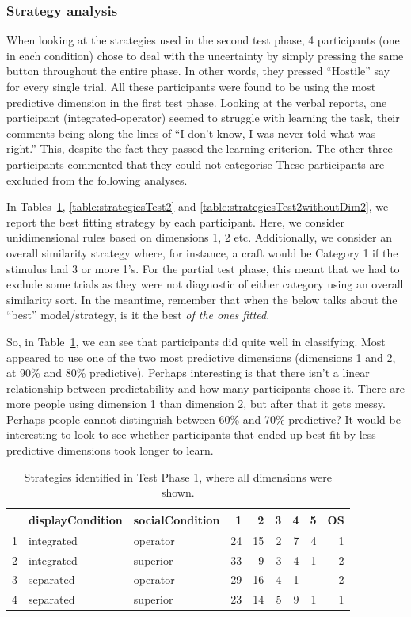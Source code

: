 \documentclass[doc, a4paper, apacite]{apa6}
\begin{document}
\subsubsection{Strategy analysis}

When looking at the strategies used in the second test phase, 4 participants (one in each condition) chose to deal with the uncertainty by simply pressing the same button throughout the entire phase.
In other words, they pressed ``Hostile'' say for every single trial.
All these participants were found to be using the most predictive dimension in the first test phase. 
Looking at the verbal reports, one participant (integrated-operator) seemed to struggle with learning the task, their comments being along the lines of ``I don't know, I was never told what was right.''
This, despite the fact they passed the learning criterion. 
The other three participants commented that they could not categorise 
These participants are excluded from the following analyses. 

In Tables~\ref{table:strategiesTest1}, \ref{table:strategiesTest2} and \ref{table:strategiesTest2withoutDim2}, we report the best fitting strategy by each participant. 
Here, we consider unidimensional rules based on dimensions 1, 2 etc. 
Additionally, we consider an overall similarity strategy where, for instance, a craft would be Category 1 if the stimulus had 3 or more 1's. 
For the partial test phase, this meant that we had to exclude some trials as they were not diagnostic of either category using an overall similarity sort. 
In the meantime, remember that when the below talks about the ``best'' model/strategy, is it the best \emph{of the ones fitted}.

So, in Table~\ref{table:strategiesTest1}, we can see that participants did quite well in classifying. 
Most appeared to use one of the two most predictive dimensions (dimensions 1 and 2, at 90\% and 80\% predictive). 
Perhaps interesting is that there isn't a linear relationship between predictability and how many participants chose it. 
There are more people using dimension 1 than dimension 2, but after that it gets messy. 
Perhaps people cannot distinguish between 60\% and 70\% predictive? 
It would be interesting to look to see whether participants that ended up best fit by less predictive dimensions took longer to learn. 

\begin{table}
	\centering
	\caption{Strategies identified in Test Phase 1, where all dimensions were shown.}
	\label{table:strategiesTest1}
	\begin{tabular}{rllrrrrrr}
	  \hline
	 & displayCondition & socialCondition & 1 & 2 & 3 & 4 & 5 & OS\\ 
	  \hline
      1 & integrated & operator &  24 &  15 &   2 &   7 &   4 &   1 \\ 
	  2 & integrated & superior &  33 &   9 &   3 &   4 &   1 &   2 \\ 
	  3 & separated & operator &  29 &  16 &   4 &   1 & - &   2 \\ 
	  4 & separated & superior &  23 &  14 &   5 &   9 &   1 &   1 \\ 
	   \hline
	\end{tabular}
\end{table}
\end{document}
